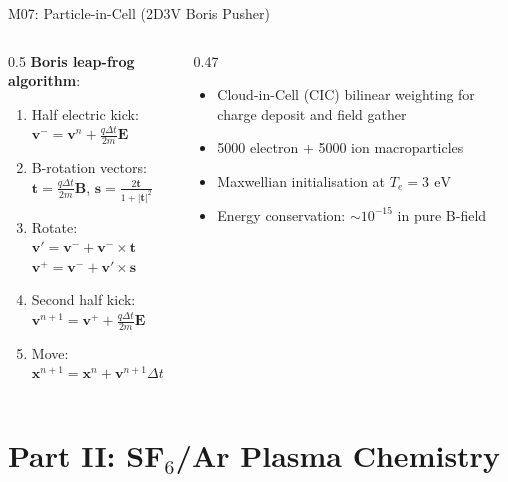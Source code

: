 \documentclass[aspectratio=169,10pt]{beamer}
\newcommand{\eV}{\,\mathrm{eV}}
\begin{document}
\begin{frame}{M07: Particle-in-Cell (2D3V Boris Pusher)}
  \begin{columns}[T]
    \begin{column}{0.5\textwidth}
      \textbf{Boris leap-frog algorithm}:
      \begin{enumerate}[]
        \item Half electric kick: $\mathbf{v}^- = \mathbf{v}^n + \frac{q\Delta t}{2m}\mathbf{E}$
        \item B-rotation vectors:\\
          $\mathbf{t} = \frac{q\Delta t}{2m}\mathbf{B}$,\quad
          $\mathbf{s} = \frac{2\mathbf{t}}{1+|\mathbf{t}|^2}$
        \item Rotate: $\mathbf{v}' = \mathbf{v}^- + \mathbf{v}^-\!\times\!\mathbf{t}$\\
          $\mathbf{v}^+ = \mathbf{v}^- + \mathbf{v}'\!\times\!\mathbf{s}$
        \item Second half kick: $\mathbf{v}^{n+1} = \mathbf{v}^+ + \frac{q\Delta t}{2m}\mathbf{E}$
        \item Move: $\mathbf{x}^{n+1} = \mathbf{x}^n + \mathbf{v}^{n+1}\Delta t$
      \end{enumerate}
    \end{column}
    \begin{column}{0.47\textwidth}
      \begin{itemize}[]
        \item Cloud-in-Cell (CIC) bilinear weighting for charge deposit and field gather
        \item 5000 electron + 5000 ion macroparticles
        \item Maxwellian initialisation at $T_e = \SI{3}{\eV}$
        \item Energy conservation: $\sim 10^{-15}$ in pure B-field
      \end{itemize}
    \end{column}
  \end{columns}
\end{frame}


\section{Part II: SF$_6$/Ar Plasma Chemistry}
\end{document}

